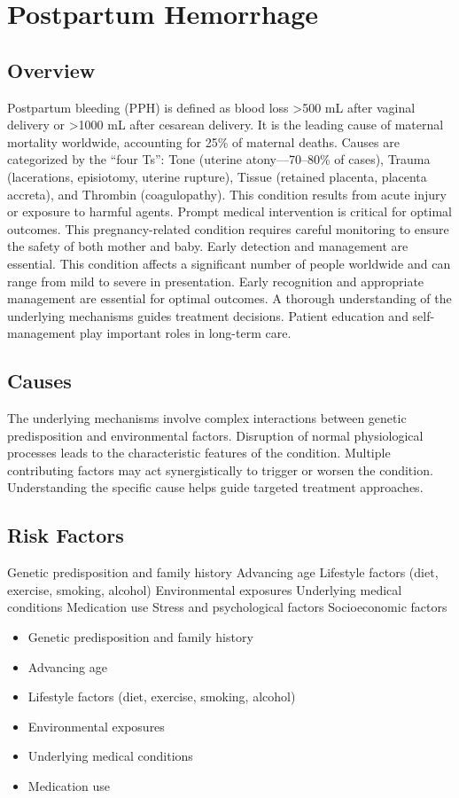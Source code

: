 \chapter{Postpartum Hemorrhage}
\label{sec:Postpartum Hemorrhage}

\section{Overview}
Postpartum bleeding (PPH) is defined as blood loss >500 mL after vaginal delivery or >1000 mL after cesarean delivery. It is the leading cause of maternal mortality worldwide, accounting for 25\% of maternal deaths. Causes are categorized by the ``four Ts'': Tone (uterine atony---70--80\% of cases), Trauma (lacerations, episiotomy, uterine rupture), Tissue (retained placenta, placenta accreta), and Thrombin (coagulopathy). This condition results from acute injury or exposure to harmful agents. Prompt medical intervention is critical for optimal outcomes. This pregnancy-related condition requires careful monitoring to ensure the safety of both mother and baby. Early detection and management are essential. This condition affects a significant number of people worldwide and can range from mild to severe in presentation. Early recognition and appropriate management are essential for optimal outcomes. A thorough understanding of the underlying mechanisms guides treatment decisions. Patient education and self-management play important roles in long-term care.
\section{Causes}
The underlying mechanisms involve complex interactions between genetic predisposition and environmental factors. Disruption of normal physiological processes leads to the characteristic features of the condition. Multiple contributing factors may act synergistically to trigger or worsen the condition. Understanding the specific cause helps guide targeted treatment approaches.
\section{Risk Factors}
Genetic predisposition and family history Advancing age Lifestyle factors (diet, exercise, smoking, alcohol) Environmental exposures Underlying medical conditions Medication use Stress and psychological factors Socioeconomic factors

\begin{itemize}[noitemsep]
  \item Genetic predisposition and family history
  \item Advancing age
  \item Lifestyle factors (diet, exercise, smoking, alcohol)
  \item Environmental exposures
  \item Underlying medical conditions
  \item Medication use
\end{itemize}
